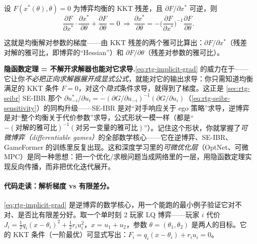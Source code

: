 \begin{theorem}[均衡解对参数的梯度]\label{thm:rtg-implicit-grad}
设 $F(x^*(\theta),\theta)=0$ 为博弈均衡的 KKT 残差，且 $\partial F/\partial x^*$ 可逆，则
\begin{equation}
  \frac{\partial F}{\partial x^*}\cdot\frac{\partial x^*}{\partial\theta}+\frac{\partial F}{\partial\theta}=0
  \ \Longrightarrow\
  \frac{\partial x^*}{\partial\theta}=-\Big(\frac{\partial F}{\partial x^*}\Big)^{-1}\frac{\partial F}{\partial\theta}.
  \label{eq:rtg-implicit-grad}
\end{equation}
\end{theorem}

\noindent 这就是均衡解对参数的梯度——由 KKT 残差的两个雅可比算出：$\partial F/\partial x^*$（残差对解的雅可比，即博弈的“Hessian”）和 $\partial F/\partial\theta$（残差对参数的雅可比）。

\begin{insight}
\textbf{隐函数定理 = 不解开求解器也能对它求导.}\;\cref{eq:rtg-implicit-grad} 的威力在于——它让你\emph{不必把正向求解器展开成显式公式}，就能对它的输出求导：你只需知道均衡满足的 KKT 条件 $F=0$，对这个\emph{隐式}条件求导，就得到了梯度。这正是 \cref{sec:rtg-seibr} SE-IBR 那个 $\partial u_{-i}^*/\partial u_i=-(\partial G/\partial u_{-i})^{-1}(\partial G/\partial u_i)$（\cref{eq:rtg-seibr-sensitivity}）的同构升级——SE-IBR 是对“对手响应关于 ego 策略”求导，逆博弈是对“整个均衡关于代价参数”求导，公式形状一模一样（都是“$-(\text{对解的雅可比})^{-1}(\text{对另一变量的雅可比})$”）。记住这个形状，你就掌握了\emph{可微博弈（differentiable games）}的全部数学核心——它在逆博弈、SE-IBR、GameFormer 的训练里反复出现。这和深度学习里的\emph{可微优化层}（OptNet、可微 MPC）是同一种思想：把一个优化/求根问题当成网络里的一层，用隐函数定理实现反向传播，而非把优化迭代展开。
\end{insight}

\paragraph{代码走读：解析梯度 vs 有限差分。}
\cref{eq:rtg-implicit-grad} 是逆博弈的数学核心，用一个能跑的最小例子验证它对不对、是否比有限差分好。取一个单时刻 2 玩家 LQ 博弈——玩家 $i$ 代价 $J_i=\tfrac12 q_i(x-\theta_i)^2+\tfrac12 r_i u_i^2$，$x=u_1+u_2$，参数 $\theta=(\theta_1,\theta_2)$ 是两人的目标。它的 KKT 条件（一阶最优）可显式写出：$F_i=q_i(x-\theta_i)+r_i u_i=0$。

